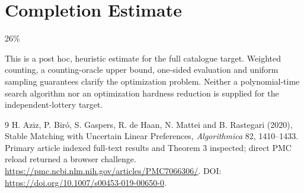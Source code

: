 \documentclass[11pt]{article}
\begin{document}
\section{Completion Estimate}
26\%

This is a post hoc, heuristic estimate for the full catalogue target.
Weighted counting, a counting-oracle upper bound, one-sided evaluation and uniform sampling guarantees clarify the optimization problem. Neither a polynomial-time search algorithm nor an optimization hardness reduction is supplied for the independent-lottery target.

\begin{thebibliography}{9}
 H. Aziz, P. Bir\'o, S. Gaspers, R. de Haan, N. Mattei and B. Rastegari (2020), Stable Matching with Uncertain Linear Preferences, \emph{Algorithmica} 82, 1410--1433. Primary article indexed full-text results and Theorem 3 inspected; direct PMC reload returned a browser challenge. \url{https://pmc.ncbi.nlm.nih.gov/articles/PMC7066306/}. DOI: \url{https://doi.org/10.1007/s00453-019-00650-0}.
\end{thebibliography}
\end{document}
